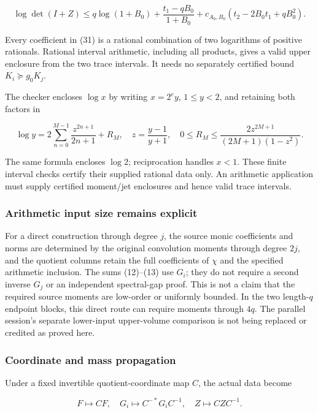 \documentclass[
  11pt,
]{article}
\begin{document}
\[
 \log\det(I+Z)\le
 q\log(1+B_0)+\frac{t_1-qB_0}{1+B_0}
 +c_{A_0,B_0}(t_2-2B_0t_1+qB_0^2).                            \tag{31}
\]

Every coefficient in (31) is a rational combination of two logarithms of
positive rationals. Rational interval arithmetic, including all
products, gives a valid upper enclosure from the two trace intervals. It
needs no separately certified bound \(K_i\succeq g_0K_j\).

The checker encloses \(\log x\) by writing \(x=2^ey\), \(1\le y<2\), and
retaining both factors in

\[
 \log y=2\sum_{n=0}^{M-1}\frac{z^{2n+1}}{2n+1}+R_M,
 \quad z=\frac{y-1}{y+1},\quad
 0\le R_M\le\frac{2z^{2M+1}}{(2M+1)(1-z^2)}.
\]

The same formula encloses \(\log2\); reciprocation handles \(x<1\).
These finite interval checks certify their supplied rational data only.
An arithmetic application must supply certified moment/jet enclosures
and hence valid trace intervals.

\subsubsection{Arithmetic input size remains
explicit}\label{arithmetic-input-size-remains-explicit}

For a direct construction through degree \(j\), the source monic
coefficients and norms are determined by the original convolution
moments through degree \(2j\), and the quotient columns retain the full
coefficients of \(\chi\) and the specified arithmetic inclusion. The
sums (12)--(13) use \(G_i\); they do not require a second inverse
\(G_j\) or an independent spectral-gap proof. This is not a claim that
the required source moments are low-order or uniformly bounded. In the
two length-\(q\) endpoint blocks, this direct route can require moments
through \(4q\). The parallel session's separate lower-input upper-volume
comparison is not being replaced or credited as proved here.

\subsubsection{Coordinate and mass
propagation}\label{coordinate-and-mass-propagation}

Under a fixed invertible quotient-coordinate map \(C\), the actual data
become

\[
 F\mapsto CF,\quad G_i\mapsto C^{-*}G_iC^{-1},\quad
 Z\mapsto CZC^{-1}.
\]
\end{document}
